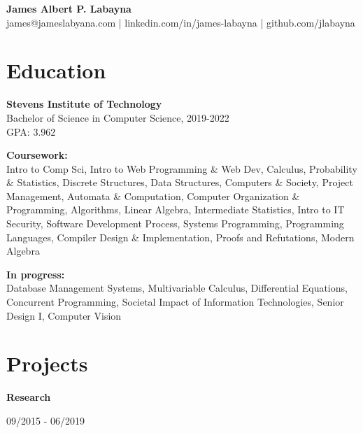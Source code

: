 \documentclass[10pt,letterpaper]{article}
\begin{document}
  \begin{center}
    \textbf{James Albert P. Labayna} \\
    \small james@jameslabyana.com | linkedin.com/in/james-labayna | github.com/jlabayna
  \end{center}
  
  \iffalse
  \begin{minipage}[t]{2in}
    \textbf{Present Address:} \\
    205 Hudson St, Apt. 602 \\
    Hoboken, NJ 07030 \\
    201.256.7526
  \end{minipage}
  \hfill
  \begin{minipage}[t]{2.4in}
    \textbf{Permanent Address:} \\
    294 S. Washington Ave., Apt. 87 \\
    Bergenfield, NJ 07030
  \end{minipage}
  \fi
  
  \section{Education}
    \textbf{Stevens Institute of Technology} \\
    Bachelor of Science in Computer Science, 2019-2022 \\
    GPA: 3.962
    
    \noindent\textbf{Coursework:}\\
    Intro to Comp Sci, Intro to Web Programming \& Web Dev, Calculus, Probability \& Statistics, Discrete Structures, Data Structures, Computers \& Society, Project Management, Automata \& Computation, Computer Organization \& Programming, Algorithms, Linear Algebra, Intermediate Statistics, Intro to IT Security, Software Development Process, Systems Programming, Programming Languages, Compiler Design \& Implementation, Proofs and Refutations, Modern Algebra
    
    \textbf{In progress:}\\
    Database Management Systems, Multivariable Calculus, Differential Equations, Concurrent Programming, Societal Impact of Information Technologies, Senior Design I, Computer Vision 

  \section{Projects}
    \textbf{Research}\hfill
    \begin{minipage}[t]{1.2in}
      09/2015 - 06/2019
    \end{minipage}
    
\end{document}
